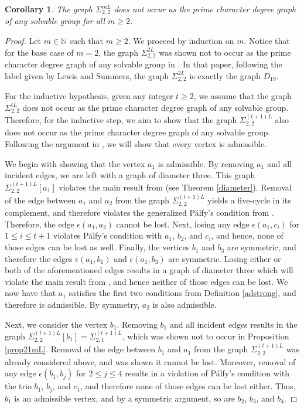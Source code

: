 \documentclass[11pt]{amsart}
\newtheorem{corollary}[theorem]{Corollary}
\theoremstyle{definition}
\theoremstyle{remark}
\numberwithin{equation}{section}
\newcommand{\SLi}[3]{\Sigma_{#1,#2}^{#3L}} %
\begin{document}
\begin{corollary}\label{cor22mL}
The graph $\SLi{2}{2}{m}$ does not occur as the prime character degree graph of any solvable group for all $m\geq2$.
\end{corollary}
\begin{proof}
Let $m\in\mathbb{N}$ such that $m\geq2$. We proceed by induction on $m$. Notice that for the base case of $m=2$, the graph $\SLi{2}{2}{2}$ was shown not to occur as the prime character degree graph of any solvable group in \cite{LS2}. In that paper, following the label given by Lewis and Summers, the graph $\SLi{2}{2}{2}$ is exactly the graph $D_{19}$.

For the inductive hypothesis, given any integer $t\geq2$, we assume that the graph $\SLi{2}{2}{t}$ does not occur as the prime character degree graph of any solvable group. Therefore, for the inductive step, we aim to show that the graph $\SLi{2}{2}{(t+1)}$ also does not occur as the prime character degree graph of any solvable group. Following the argument in \cite{LS2}, we will show that every vertex is admissible.

We begin with showing that the vertex $a_1$ is admissible. By removing $a_1$ and all incident edges, we are left with a graph of diameter three. This graph $\SLi{2}{2}{(t+1)}[a_1]$ violates the main result from \cite{S} (see Theorem \ref{diameter}). Removal of the edge between $a_1$ and $a_2$ from the graph $\SLi{2}{2}{(t+1)}$ yields a five-cycle in its complement, and therefore violates the generalized P\'alfy's condition from \cite{A}. Therefore, the edge $\epsilon(a_1,a_2)$ cannot be lost. Next, losing any edge $\epsilon(a_1,c_i)$ for $1\leq i\leq t+1$ violates P\'alfy's condition with $a_1$, $b_2$, and $c_i$, and hence, none of those edges can be lost as well. Finally, the vertices $b_1$ and $b_3$ are symmetric, and therefore the edges $\epsilon(a_1,b_1)$ and $\epsilon(a_1,b_3)$ are symmetric. Losing either or both of the aforementioned edges results in a graph of diameter three which will violate the main result from \cite{S}, and hence neither of those edges can be lost. We now have that $a_1$ satisfies the first two conditions from Definition \ref{adstrong}, and therefore is admissible. By symmetry, $a_2$ is also admissible.

Next, we consider the vertex $b_1$. Removing $b_1$ and all incident edges results in the graph $\SLi{2}{2}{(t+1)}[b_1]=\SLi{2}{1}{(t+1)}$, which was shown not to occur in Proposition \ref{prop21mL}. Removal of the edge between $b_1$ and $a_1$ from the graph $\SLi{2}{2}{(t+1)}$ was already considered above, and was shown it cannot be lost. Moreover, removal of any edge $\epsilon(b_1,b_j)$ for $2\leq j\leq4$ results in a violation of P\'alfy's condition with the trio $b_1$, $b_j$, and $c_1$, and therefore none of those edges can be lost either. Thus, $b_1$ is an admissible vertex, and by a symmetric argument, so are $b_2$, $b_3$, and $b_4$.


\end{proof}
\end{document}
